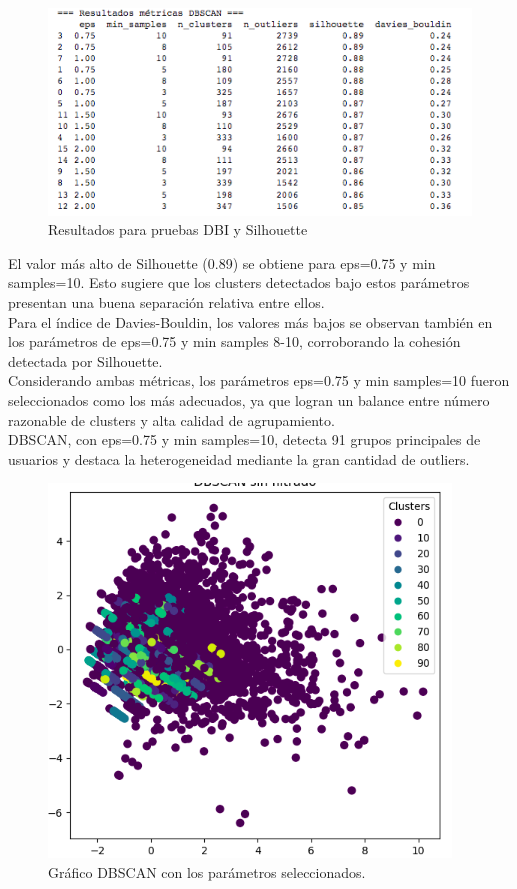\documentclass{article}
\begin{document}
{\begin{figure}[H]
    \centering
    \includegraphics[width=1\linewidth]{Resultado_1.png}
    \caption{Resultados para pruebas DBI y Silhouette}
    \label{fig:resultado}
\end{figure}

El valor más alto de Silhouette (0.89) se obtiene para eps=0.75 y min samples=10. Esto sugiere que los clusters detectados bajo estos parámetros presentan una buena separación relativa entre ellos.\\

Para el índice de Davies-Bouldin, los valores más bajos  se observan también en los parámetros de eps=0.75 y min samples 8-10, corroborando la cohesión detectada por Silhouette.\\

Considerando ambas métricas, los parámetros eps=0.75 y min samples=10 fueron seleccionados como los más adecuados, ya que logran un balance entre número razonable de clusters y alta calidad de agrupamiento.\\

DBSCAN, con eps=0.75 y min samples=10, detecta 91 grupos principales de usuarios y destaca la heterogeneidad mediante la gran cantidad de outliers.

\begin{figure}[H]
    \centering
    \includegraphics[width=0.5\linewidth]{Resultado_2.png}
    \caption{Gráfico DBSCAN con los parámetros seleccionados.}
    \label{fig:dbscan:graphic}
\end{figure}


}
\end{document}
